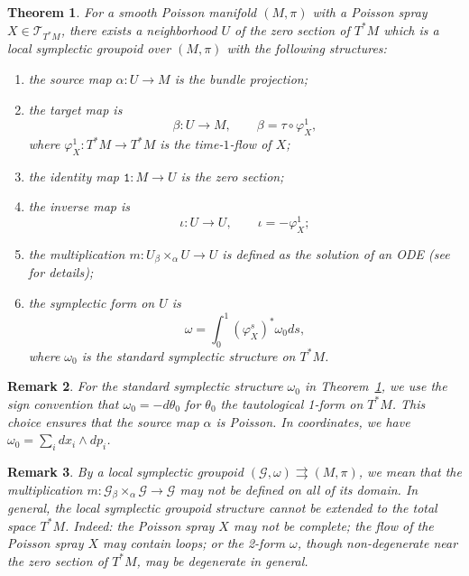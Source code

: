 \documentclass{amsart}
\newtheorem{theorem}{Theorem}[section]
\newtheorem{remark}[theorem]{Remark}
\numberwithin{equation}{section}
\newcommand{\cG}{\mathcal{G}}
\newcommand{\cT}{\mathcal{T}}
\newcommand{\rra}{\rightrightarrows}
\begin{document}
\begin{theorem} 
  \cite{MR2900786, CMS17} 
  \label{thm:poissp}
  For a smooth Poisson manifold $(M, \pi)$ with a Poisson spray $X \in \cT_{T^*M}$, there exists a neighborhood $U$ of the zero section of $T^*M$ which is a local symplectic groupoid over $(M, \pi)$ with the following structures:
  \begin{enumerate}
    \item the source map $\alpha: U \to M$ is the bundle projection;
    \item the target map is
      \[\beta: U \to M, \qquad \beta = \tau \circ \varphi_X^1,\]
      where $\varphi_X^1: T^*M \to T^*M$ is the time-$1$-flow of $X$;
    \item the identity map $\mathtt{1}: M \to U$ is the zero section;
    \item the inverse map is
      \[\iota: U \to U, \qquad \iota = -\varphi_X^1;\]
    \item the multiplication $m: U {_\beta \times_\alpha} U \to U$ is defined as the solution of an ODE (see \cite{CMS17} for details);
    \item the symplectic form on $U$ is
      \[\omega = \int_{0}^{1} (\varphi_X^s)^*\omega_0 ds,\]
      where $\omega_0$ is the standard symplectic structure on $T^*M$.
  \end{enumerate}
\end{theorem}

\begin{remark}
  For the standard symplectic structure $\omega_0$ in Theorem~\ref{thm:poissp}, we use the sign convention that $\omega_0 = - d \theta_0$ for $\theta_0$ the tautological 1-form on $T^*M$.
  This choice ensures that the source map $\alpha$ is Poisson.
  In coordinates, we have $\omega_0 = \sum_i d x_i \wedge d p_i$.
\end{remark}

\begin{remark}
  By a local symplectic groupoid $(\cG, \omega) \rra (M, \pi)$, we mean that the multiplication $m: \cG {_\beta \times_\alpha} \cG \to \cG$ may not be defined on all of its domain.
  In general, the local symplectic groupoid structure cannot be extended to the total space $T^*M$.
  Indeed: the Poisson spray $X$ may not be complete; the flow of the Poisson spray $X$ may contain loops; or the 2-form $\omega$, though non-degenerate near the zero section of $T^*M$, may be degenerate in general.
\end{remark}
\end{document}
